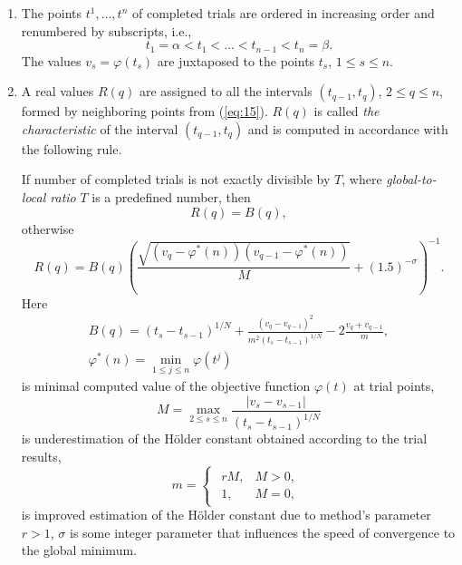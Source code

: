 \documentclass[runningheads]{llncs}
\begin{document}
\begin{enumerate}
\item 
The points $t^1, \dots, t^n$ of completed trials are ordered in increasing order and renumbered by subscripts, i.e.,
\begin{equation}\label{eq:15}
t_1 = \alpha < t_1 < \dots < t_{n-1} < t_n = \beta.
\end{equation}
The values $v_s = \varphi(t_s)$ are juxtaposed to the points  $t_s$, $1 \leq s \leq n$.
\item 
A real values $R(q)$ are assigned to all the intervals $(t_{q-1}, t_q)$, $2 \leq q \leq n$, formed by neighboring points from (\ref{eq:15}). $R(q)$ is called \textit{the characteristic} of the interval $(t_{q-1}, t_q)$ and is computed in accordance with the following rule.

If number of completed trials is not exactly divisible by $T$, where \textit{global-to-local ratio} $T$ is a predefined number, then
\begin{equation}\label{eq:16}
R(q) = B(q),
\end{equation}
otherwise
\begin{equation}\label{eq:17}
R(q) = B(q)\left( \frac {\sqrt{(v_q - \varphi^*(n))(v_{q-1} - \varphi^*(n))}}{M} +(1.5)^{-\sigma}\right)^{-1}.
\end{equation}
Here
\begin{equation}\label{eq:18}
\begin{matrix}
B(q) = (t_s - t_{s-1})^{1/N} + \frac{(v_q - v_{q-1})^2} {m^2 (t_s - t_{s-1})^{1/N}} -2\frac{v_{q} + v_{q-1}}{m},\\
\varphi^*(n) = \min_{1\leq j \leq n} {\varphi(t^j)}
\end{matrix}
\end{equation}
is minimal computed value of the objective function $\varphi(t)$ at trial points,
\begin{equation}\label{eq:19}
M = \max_{2 \leq  s \leq n} { \frac{|v_s - v_{s-1}|}{(t_s - t_{s-1})^{1/N}} }
\end{equation}
is underestimation of the H{\"o}lder constant obtained according to the trial results,
\begin{equation}\label{eq:20}
m = 
\begin{cases}
\begin{matrix}
rM, & M>0, \\
1, & M= 0,
\end{matrix}
\end{cases}
\end{equation}
is improved estimation of the H{\"o}lder constant due to method's parameter $r>1$, $\sigma$ is some integer parameter that influences the speed of convergence to the global minimum.


\end{enumerate}
\end{document}
